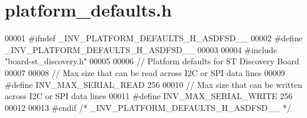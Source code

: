 \section{platform\+\_\+defaults.\+h}
\label{platform__defaults_8h_source}

\begin{DoxyCode}
00001 \textcolor{preprocessor}{#}\textcolor{preprocessor}{ifndef} \textcolor{preprocessor}{\_INV\_PLATFORM\_DEFAULTS\_H\_ASDFSD\_\_}
00002 \textcolor{preprocessor}{#}\textcolor{preprocessor}{define} \textcolor{preprocessor}{\_INV\_PLATFORM\_DEFAULTS\_H\_ASDFSD\_\_}
00003 
00004 \textcolor{preprocessor}{#}\textcolor{preprocessor}{include} "board-st_discovery.h"
00005 
00006 \textcolor{comment}{// Platform defaults for ST Discovery Board}
00007 
00008 \textcolor{comment}{// Max size that can be read across I2C or SPI data lines}
00009 \textcolor{preprocessor}{#}\textcolor{preprocessor}{define} \textcolor{preprocessor}{INV\_MAX\_SERIAL\_READ} 256
00010 \textcolor{comment}{// Max size that can be written across I2C or SPI data lines}
00011 \textcolor{preprocessor}{#}\textcolor{preprocessor}{define} \textcolor{preprocessor}{INV\_MAX\_SERIAL\_WRITE} 256
00012 
00013 \textcolor{preprocessor}{#}\textcolor{preprocessor}{endif}  \textcolor{comment}{/* \_INV\_PLATFORM\_DEFAULTS\_H\_ASDFSD\_\_ */}
\end{DoxyCode}
